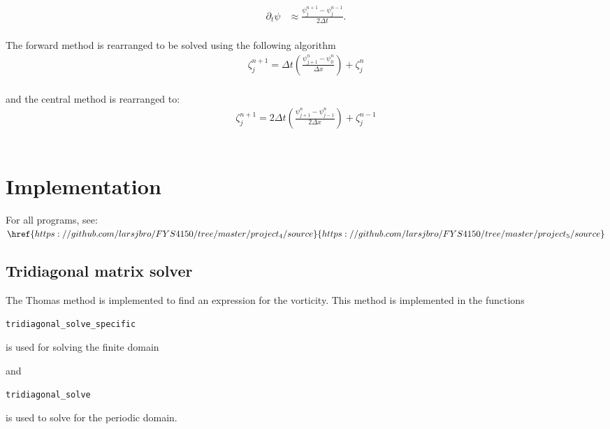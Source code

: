 \begin{align}
  \label{eq:Rossby4}
	\partial_t\psi &\approx \frac{\psi_{j}^{n+1} - \psi_{j}^{n-1}}{2\Delta t}.
\end{align}\\

The forward method is rearranged to be solved using the following algorithm\\

\begin{align}
\zeta_j^{n+1} = \Delta t(\frac{\psi_{j+1}^n-\psi_{0}^n}{\Delta x})+\zeta_j^{n}
\end{align}\\

and the central method is rearranged to:\\

\begin{align}
\zeta_j^{n+1} = 2\Delta t(\frac{\psi_{j+1}^n-\psi_{j-1}^n}{2\Delta x})+\zeta_j^{n-1}
\end{align}\\


 






\newpage
\section{Implementation}
For all programs, see:\\
$\href{https://github.com/larsjbro/FYS4150/tree/master/project_4/source}{https://github.com/larsjbro/FYS4150/tree/master/project_5/source}$


\subsection{Tridiagonal matrix solver}
The Thomas method is implemented to find an expression for the vorticity. This method is implemented in the functions

\begin{verbatim}
tridiagonal_solve_specific
\end{verbatim}

is used for solving the finite domain

and 

\begin{verbatim}
tridiagonal_solve
\end{verbatim}

is used to solve for the periodic domain.

